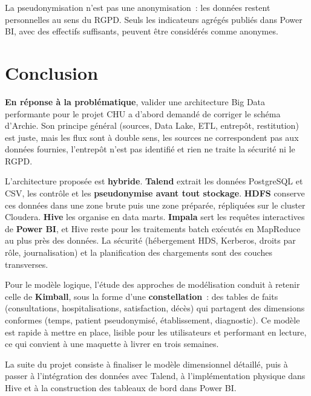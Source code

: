 \noindent La pseudonymisation n'est pas une anonymisation~: les données restent personnelles au sens du RGPD. Seuls les indicateurs agrégés publiés dans Power BI, avec des effectifs suffisants, peuvent être considérés comme anonymes.

\newpage
\section*{Conclusion}
{}

\noindent \textbf{En réponse à la problématique}, valider une architecture Big Data performante pour le projet CHU a d'abord demandé de corriger le schéma d'Archie. Son principe général (sources, Data Lake, ETL, entrepôt, restitution) est juste, mais les flux sont à double sens, les sources ne correspondent pas aux données fournies, l'entrepôt n'est pas identifié et rien ne traite la sécurité ni le RGPD.

\vspace{0.2cm}

\noindent L'architecture proposée est \textbf{hybride}. \textbf{Talend} extrait les données PostgreSQL et CSV, les contrôle et les \textbf{pseudonymise avant tout stockage}. \textbf{HDFS} conserve ces données dans une zone brute puis une zone préparée, répliquées sur le cluster Cloudera. \textbf{Hive} les organise en data marts. \textbf{Impala} sert les requêtes interactives de \textbf{Power BI}, et Hive reste pour les traitements batch exécutés en MapReduce au plus près des données. La sécurité (hébergement HDS, Kerberos, droits par rôle, journalisation) et la planification des chargements sont des couches transverses.

\vspace{0.2cm}

\noindent Pour le modèle logique, l'étude des approches de modélisation conduit à retenir celle de \textbf{Kimball}, sous la forme d'une \textbf{constellation}~: des tables de faits (consultations, hospitalisations, satisfaction, décès) qui partagent des dimensions conformes (temps, patient pseudonymisé, établissement, diagnostic). Ce modèle est rapide à mettre en place, lisible pour les utilisateurs et performant en lecture, ce qui convient à une maquette à livrer en trois semaines.

\vspace{0.2cm}

\noindent La suite du projet consiste à finaliser le modèle dimensionnel détaillé, puis à passer à l'intégration des données avec Talend, à l'implémentation physique dans Hive et à la construction des tableaux de bord dans Power BI.

